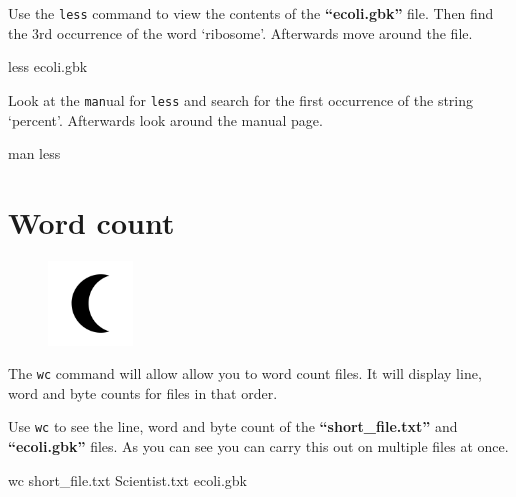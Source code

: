 \documentclass[
  letterpaper,
  DIV=11,
  numbers=noendperiod]{scrreprt}
\newenvironment{Shaded}{\begin{snugshade}}{\end{snugshade}}
\newcommand{\FunctionTok}[1]{\textcolor[rgb]{0.28,0.35,0.67}{#1}}
\newcommand{\NormalTok}[1]{\textcolor[rgb]{0.00,0.23,0.31}{#1}}
\begin{document}
Use the \texttt{less} command to view the contents of the
\textbf{``ecoli.gbk''} file. Then find the 3rd occurrence of the word
`ribosome'. Afterwards move around the file.

\begin{Shaded}
\begin{Highlighting}[]
\FunctionTok{less}\NormalTok{ ecoli.gbk}
\end{Highlighting}
\end{Shaded}

Look at the \texttt{man}ual for \texttt{less} and search for the first
occurrence of the string `percent'. Afterwards look around the manual
page.

\begin{Shaded}
\begin{Highlighting}[]
\FunctionTok{man}\NormalTok{ less}
\end{Highlighting}
\end{Shaded}

\hypertarget{word-count}{%
\section{Word count}\label{word-count}}

\begin{figure}

{\centering \includegraphics[width=0.2\textwidth,height=\textheight]{figures/wc.png}

}

\end{figure}

The \texttt{wc} command will allow allow you to word count files. It
will display line, word and byte counts for files in that order.

Use \texttt{wc} to see the line, word and byte count of the
\textbf{``short\_file.txt''} and \textbf{``ecoli.gbk''} files. As you
can see you can carry this out on multiple files at once.

\begin{Shaded}
\begin{Highlighting}[]
\FunctionTok{wc}\NormalTok{ short\_file.txt Scientist.txt ecoli.gbk}
\end{Highlighting}
\end{Shaded}
\end{document}
